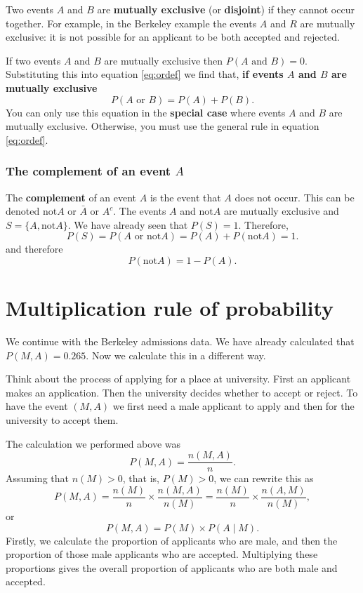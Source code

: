 \documentclass[
  11pt,
  british,
  openany, a4paper]{book}
\begin{document}
Two events \(A\) and \(B\) are \textbf{mutually exclusive} (or \textbf{disjoint}) if they cannot occur together. For example, in the Berkeley example the events \(A\) and \(R\) are mutually exclusive: it is not possible for an applicant to be both accepted and rejected.

If two events \(A\) and \(B\) are mutually exclusive then \(P(A \mbox{ and } B)=0\). Substituting this into equation \eqref{eq:ordef} we find that, \textbf{if events \(A\) and \(B\) are mutually exclusive}
\begin{equation}
P(A \mbox{ or } B) = P(A) + P(B). 
\label{eq:mut}
\end{equation}
You can only use this equation in the \textbf{special case} where events \(A\) and \(B\) are mutually exclusive. Otherwise, you must use the general rule in equation \eqref{eq:ordef}.

\hypertarget{the-complement-of-an-event-a}{%
\subsubsection*{\texorpdfstring{The complement of an event \(A\)}{The complement of an event A}}\label{the-complement-of-an-event-a}}

The \textbf{complement} of an event \(A\) is the event that \(A\) does not occur. This can be denoted \(\mbox{not}A\) or \(\bar{A}\) or \(A^c\). The events \(A\) and \(\mbox{not}A\) are mutually exclusive and \(S=\{A, \mbox{not}A\}\). We have already seen that \(P(S) = 1\). Therefore,
\[ P(S)=P(A \mbox{ or } \mbox{not}A) = P(A) + P(\mbox{not}A) = 1. \]
and therefore
\[ P(\mbox{not}A) = 1 - P(A). \]

\hypertarget{multrule}{%
\section{Multiplication rule of probability}\label{multrule}}

We continue with the Berkeley admissions data. We have already calculated that \(P(M , A)=0.265\). Now we calculate this in a different way.

Think about the process of applying for a place at university. First an applicant makes an application. Then the university decides whether to accept or reject. To have the event \((M, A)\) we first need a male applicant to apply and then for the university to accept them.

The calculation we performed above was
\[ P(M , A) = \frac{n(M , A)}{n}. \]
Assuming that \(n(M)>0\), that is, \(P(M)>0\), we can rewrite this as
\[ P(M , A) = \frac{n(M)}{n} \times \frac{n(M , A)}{n(M)} = \frac{n(M)}{n} \times \frac{n(A , M)}{n(M)}, \]
or
\[ P(M , A) = P(M) \times P(A \mid M). \]
Firstly, we calculate the proportion of applicants who are male, and then the proportion of those male applicants who are accepted. Multiplying these proportions gives the overall proportion of applicants who are both male and accepted.
\end{document}
